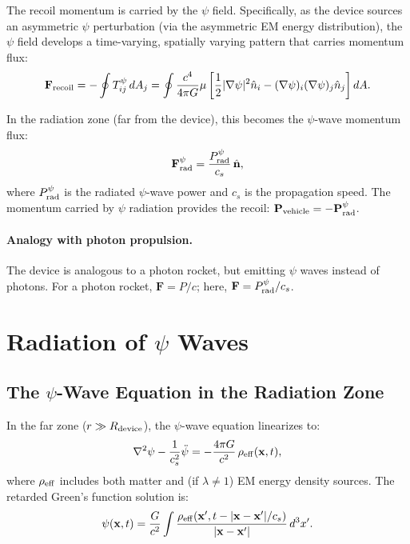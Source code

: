 \documentclass[aps,prd,twocolumn,superscriptaddress,floatfix,nofootinbib]{revtex4-2}
\newcommand{\mufunction}{\mu}
\newcommand{\lam}{\lambda}
\begin{document}
The recoil momentum is carried by the $\psi$ field. Specifically, as
the device sources an asymmetric $\psi$ perturbation (via the asymmetric
EM energy distribution), the $\psi$ field develops a time-varying,
spatially varying pattern that carries momentum flux:
\begin{equation}
\mathbf{F}_{\rm recoil} = -\oint T_{ij}^\psi\,dA_j
= \oint \frac{c^4}{4\pi G}\mufunction\left[
\frac{1}{2}|\nabla\psi|^2\hat{n}_i - (\nabla\psi)_i(\nabla\psi)_j\hat{n}_j
\right]dA.
\label{eq:psi-momentum-flux}
\end{equation}

In the radiation zone (far from the device), this becomes the
$\psi$-wave momentum flux:
\begin{equation}
\mathbf{F}_{\rm rad}^\psi = \frac{P_{\rm rad}^\psi}{c_s}\,\hat{\mathbf{n}},
\label{eq:rad-momentum}
\end{equation}
where $P_{\rm rad}^\psi$ is the radiated $\psi$-wave power and $c_s$
is the propagation speed. The momentum carried by $\psi$ radiation
provides the recoil: $\mathbf{P}_{\rm vehicle} = -\mathbf{P}_{\rm rad}^\psi$.

\paragraph{Analogy with photon propulsion.} The device is analogous to
a photon rocket, but emitting $\psi$ waves instead of photons. For a
photon rocket, $\mathbf{F} = P/c$; here,
$\mathbf{F} = P_{\rm rad}^\psi/c_s$.


\section{Radiation of $\psi$ Waves}\label{sec:psi-radiation}

\subsection{The $\psi$-Wave Equation in the Radiation Zone}

In the far zone ($r \gg R_{\rm device}$), the $\psi$-wave equation
linearizes to:
\begin{equation}
\nabla^2\psi - \frac{1}{c_s^2}\ddot\psi
= -\frac{4\pi G}{c^2}\,\rho_{\rm eff}(\mathbf{x},t),
\label{eq:psi-wave-eq}
\end{equation}
where $\rho_{\rm eff}$ includes both matter and (if $\lam \neq 1$)
EM energy density sources. The retarded Green's function solution is:
\begin{equation}
\psi(\mathbf{x},t) = \frac{G}{c^2}\int
\frac{\rho_{\rm eff}(\mathbf{x}',t-|\mathbf{x}-\mathbf{x}'|/c_s)}
{|\mathbf{x}-\mathbf{x}'|}\,d^3x'.
\label{eq:retarded-solution}
\end{equation}
\end{document}
